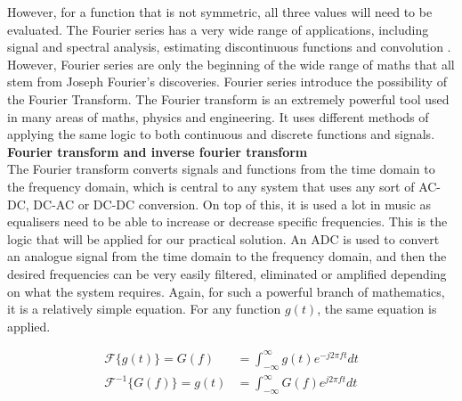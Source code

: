 \documentclass[12pt,a4paper]{article}
\begin{document}
However, for a function that is not symmetric, all three values will need to be evaluated.  
The Fourier series has a very wide range of applications, including signal and spectral analysis, estimating discontinuous functions and convolution \cite{FourierSeries}. However, Fourier series are only the beginning of the wide range of maths that all stem from Joseph Fourier’s discoveries. Fourier series introduce the possibility of the Fourier Transform. The Fourier transform is an extremely powerful tool used in many areas of maths, physics and engineering. It uses different methods of applying the same logic to both continuous and discrete functions and signals.\\ 
\newpage
\vspace*{5mm}
\textbf{Fourier transform and inverse fourier transform}\\
The Fourier transform converts signals and functions from the time domain to the frequency domain, which is central to any system that uses any sort of AC-DC, DC-AC or DC-DC conversion. On top of this, it is used a lot in music as equalisers need to be able to increase or decrease specific frequencies. This is the logic that will be applied for our practical solution. An ADC is used to convert an analogue signal from the time domain to the frequency domain, and then the desired frequencies can be very easily filtered, eliminated or amplified depending on what the system requires.
Again, for such a powerful branch of mathematics, it is a relatively simple equation. For any function $g(t)$, the same equation is applied.

\begin{align*}
    \mathcal{F}\{g(t)\} = G(f) &= \int^{\infty}_{-\infty}g(t) e^{-j2\pi ft}dt\\
    \mathcal{F}^{-1}\{G(f)\} = g(t) &= \int^{\infty}_{-\infty}G(f) e^{j2\pi ft}dt
\end{align*}
\end{document}
